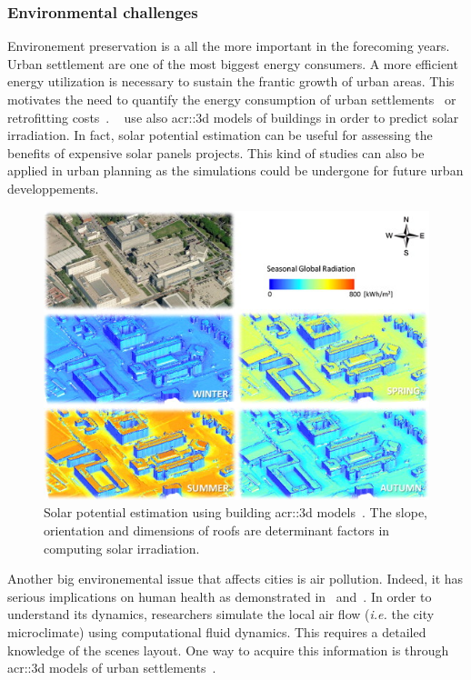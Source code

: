         \subsubsection{Environmental challenges}
            Environement preservation is a all the more important in the forecoming years.
            Urban settlement are one of the most biggest energy consumers.
            A more efficient energy utilization is necessary to sustain the frantic growth of urban areas.
            This motivates the need to quantify the energy consumption of urban settlements~\parencite{WATE20153372} or retrofitting costs~\parencite{previtali2014automatic}.
            ~\textcite{biljecki2015propagation} use also \gls{acr::3d} models of buildings in order to predict solar irradiation.
            In fact, solar potential estimation can be useful for assessing the benefits of expensive solar panels projects.
            This kind of studies can also be applied in urban planning as the simulations could be undergone for future urban developpements.\\
            \begin{figure}[htpb]
                \centering
                \includegraphics[width=.7\textwidth]{images/introduction/3d_model_applications/solar_potential}
                \caption{
                    \label{fig::solar_potential} Solar potential estimation using building \gls{acr::3d} models~\parencite{redweik2013solar}.
                    The slope, orientation and dimensions of roofs are determinant factors in computing solar irradiation.
                }
            \end{figure}
            Another big environemental issue that affects cities is air pollution.
            Indeed, it has serious implications on human health as demonstrated in~\textcite{pascal2013assessing} and~\textcite{chen2013evidence}.
            In order to understand its dynamics, researchers simulate the local air flow (\textit{i.e.} the city microclimate) using computational fluid dynamics.
            This requires a detailed knowledge of the scenes layout.
            One way to acquire this information is through \gls{acr::3d} models of urban settlements~\parencite{ujang2013unified}.
       
